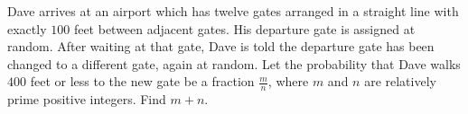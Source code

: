Dave arrives at an airport which has twelve gates arranged in a straight line with exactly $ 100$ feet between adjacent gates. His departure gate is assigned at random. After waiting at that gate, Dave is told the departure gate has been changed to a different gate, again at random. Let the probability that Dave walks $ 400$ feet or less to the new gate be a fraction $ \frac{m}{n}$, where $ m$ and $ n$ are relatively prime positive integers. Find $ m+n$.